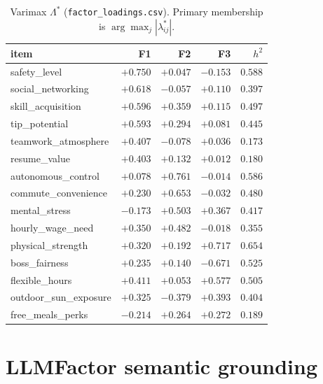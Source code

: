 \documentclass[12pt]{article}
\begin{document}
\begin{table}[ht]
\centering
\caption{Varimax \(\Lambda^{\ast}\)
(\texttt{factor\_loadings.csv}).
Primary membership is \(\arg\max_j|\lambda^{\ast}_{ij}|\).}
\label{tab:load}
\scriptsize
\begin{tabular}{@{}lrrrr@{}}
\toprule
item & F1 & F2 & F3 & \(h^{2}\) \\
\midrule
safety\_level & \(+0.750\) & \(+0.047\) & \(-0.153\) & \(0.588\) \\
social\_networking & \(+0.618\) & \(-0.057\) & \(+0.110\) & \(0.397\) \\
skill\_acquisition & \(+0.596\) & \(+0.359\) & \(+0.115\) & \(0.497\) \\
tip\_potential & \(+0.593\) & \(+0.294\) & \(+0.081\) & \(0.445\) \\
teamwork\_atmosphere & \(+0.407\) & \(-0.078\) & \(+0.036\) & \(0.173\) \\
resume\_value & \(+0.403\) & \(+0.132\) & \(+0.012\) & \(0.180\) \\
autonomous\_control & \(+0.078\) & \(+0.761\) & \(-0.014\) & \(0.586\) \\
commute\_convenience & \(+0.230\) & \(+0.653\) & \(-0.032\) & \(0.480\) \\
mental\_stress & \(-0.173\) & \(+0.503\) & \(+0.367\) & \(0.417\) \\
hourly\_wage\_need & \(+0.350\) & \(+0.482\) & \(-0.018\) & \(0.355\) \\
physical\_strength & \(+0.320\) & \(+0.192\) & \(+0.717\) & \(0.654\) \\
boss\_fairness & \(+0.235\) & \(+0.140\) & \(-0.671\) & \(0.525\) \\
flexible\_hours & \(+0.411\) & \(+0.053\) & \(+0.577\) & \(0.505\) \\
outdoor\_sun\_exposure & \(+0.325\) & \(-0.379\) & \(+0.393\) & \(0.404\) \\
free\_meals\_perks & \(-0.214\) & \(+0.264\) & \(+0.272\) & \(0.189\) \\
\bottomrule
\end{tabular}
\end{table}

\section{LLMFactor semantic grounding}
\end{document}
